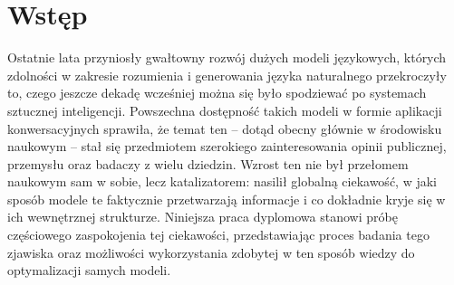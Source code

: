 \chapter{Wstęp}
Ostatnie lata przyniosły gwałtowny rozwój dużych modeli językowych, których zdolności w zakresie rozumienia i generowania języka naturalnego przekroczyły to, czego jeszcze dekadę wcześniej można się było spodziewać po systemach sztucznej inteligencji. Powszechna dostępność takich modeli w formie aplikacji konwersacyjnych sprawiła, że temat ten -- dotąd obecny głównie w środowisku naukowym -- stał się przedmiotem szerokiego zainteresowania opinii publicznej, przemysłu oraz badaczy z wielu dziedzin. Wzrost ten nie był przełomem naukowym sam w sobie, lecz katalizatorem: nasilił globalną ciekawość, w jaki sposób modele te faktycznie przetwarzają informacje i co dokładnie kryje się w ich wewnętrznej strukturze. Niniejsza praca dyplomowa stanowi próbę częściowego zaspokojenia tej ciekawości, przedstawiając proces badania tego zjawiska oraz możliwości wykorzystania zdobytej w ten sposób wiedzy do optymalizacji samych modeli.

